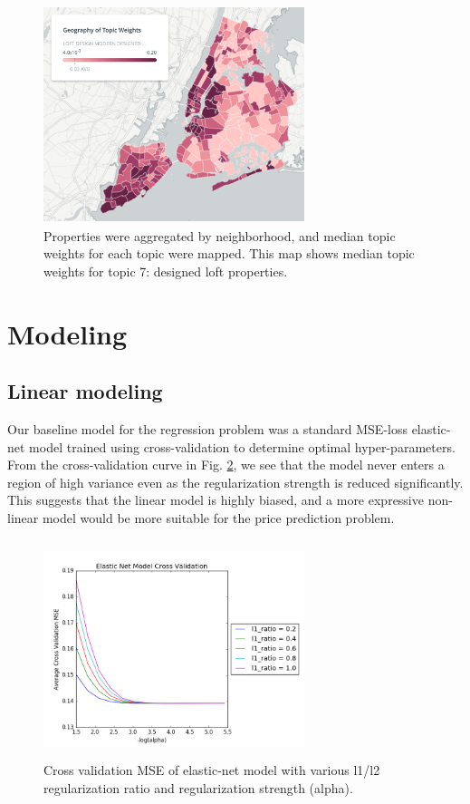 \documentclass[journal]{IEEEtran}
\begin{document}
\begin{figure}
    \centering
    \includegraphics[width=3in,height=2.5in,clip,keepaspectratio]{topic_7_map.png}
    \caption{Properties were aggregated by neighborhood, and median topic weights for each topic were mapped. This map shows median topic weights for topic 7: designed loft properties.}
    \label{fig:topic_map}
\end{figure}

\section{Modeling}
 
\subsection{Linear modeling}

Our baseline model for the regression problem was a standard MSE-loss elastic-net model trained using cross-validation to determine optimal hyper-parameters. From the cross-validation curve in Fig. \ref{fig:elastic_net}, we see that the model never enters a region of high variance even as the regularization strength is reduced significantly. This suggests that the linear model is highly biased, and a more expressive non-linear model would be more suitable for the price prediction problem.

\begin{figure}[h!]
    \includegraphics[width=3in,height=2.5in,clip,keepaspectratio]{elastic-net-cv}
    \caption{Cross validation MSE of elastic-net model with various l1/l2 regularization ratio and regularization strength (alpha).}
    \label{fig:elastic_net}
\end{figure}
\end{document}
